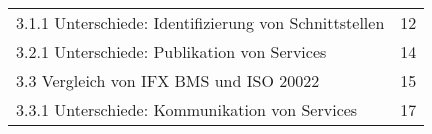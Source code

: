 \begin{tabularx}{\textwidth}{X r}
    3.1.1 Unterschiede: Identifizierung von Schnittstellen & 12\\
    3.2.1 Unterschiede: Publikation von Services & 14\\
    3.3 Vergleich von IFX BMS und ISO 20022 & 15\\
    3.3.1 Unterschiede: Kommunikation von Services & 17\\
\end{tabularx} 